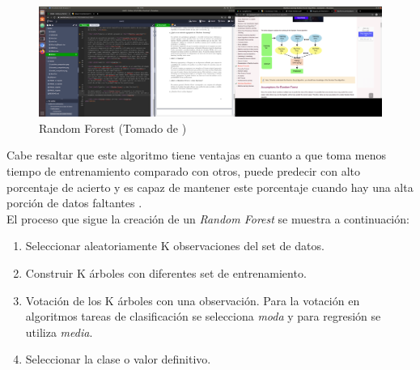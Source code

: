 \begin{itemize}
    \begin{figure}
        \centering
        \includegraphics[trim={77cm 15cm 20cm 9cm}, clip, scale = 0.5]{doc/images/randomrofest.png}
        \caption{Random Forest (Tomado de \cite{javatpoint})}
        \label{fig:RF}
    \end{figure}
    
    Cabe resaltar que este algoritmo tiene ventajas en cuanto a que toma menos tiempo de entrenamiento comparado con otros, puede predecir con alto porcentaje de acierto y es capaz de mantener este porcentaje cuando hay una alta porción de datos faltantes \cite{javatpoint}.\\
    El proceso \cite{3} que sigue la creación de un \textit{Random Forest} se muestra a continuación:
    \begin{enumerate}
        \item Seleccionar aleatoriamente K observaciones del set de datos.
        \item Construir K árboles con diferentes set de entrenamiento.
        \item Votación de los K árboles con una observación. Para la votación en algoritmos tareas de clasificación se selecciona \textit{moda} y para regresión se utiliza \textit{media}.
        \item Seleccionar la clase o valor definitivo.
    \end{enumerate}
\end{itemize}

